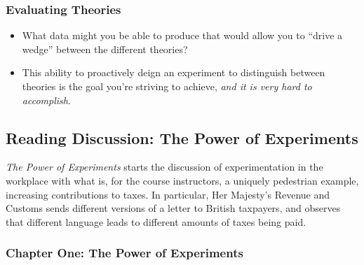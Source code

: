 \documentclass[
]{article}
\providecommand{\tightlist}{%
  \setlength{\itemsep}{0pt}\setlength{\parskip}{0pt}}
\theoremstyle{definition}
\theoremstyle{definition}
\theoremstyle{definition}
\theoremstyle{definition}
\theoremstyle{remark}
\begin{document}
\subsubsection{Evaluating Theories}\label{evaluating-theories}

\begin{itemize}
\tightlist
\item
  What data might you be able to produce that would allow you to ``drive a wedge'' between the different theories?
\item
  This ability to proactively deign an experiment to distinguish between theories is the goal you're striving to achieve, \emph{and it is very hard to accomplish}.
\end{itemize}

\subsection{Reading Discussion: The Power of Experiments}\label{reading-discussion-the-power-of-experiments}

\emph{The Power of Experiments} starts the discussion of experimentation in the workplace with what is, for the course instructors, a uniquely pedestrian example, increasing contributions to taxes. In particular, Her Majesty's Revenue and Customs sends different versions of a letter to British taxpayers, and observes that different language leads to different amounts of taxes being paid.

\subsubsection{Chapter One: The Power of Experiments}\label{chapter-one-the-power-of-experiments}
\end{document}
